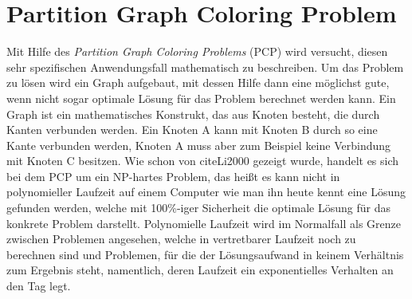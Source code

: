 \section{Partition Graph Coloring Problem}
Mit Hilfe des \textit{Partition Graph Coloring Problems} (PCP) wird versucht, diesen sehr spezifischen Anwendungsfall mathematisch zu beschreiben. Um das Problem zu lösen wird ein Graph aufgebaut, mit dessen Hilfe dann eine möglichst gute, wenn nicht sogar optimale Lösung für das Problem berechnet werden kann. Ein Graph ist ein mathematisches Konstrukt, das aus Knoten besteht, die durch Kanten verbunden werden. Ein Knoten A kann mit Knoten B durch so eine Kante verbunden werden, Knoten A muss aber zum Beispiel keine Verbindung mit Knoten C besitzen. Wie schon von cite{Li2000} gezeigt wurde, handelt es sich bei dem PCP um ein NP-hartes Problem, das heißt es kann nicht in polynomieller Laufzeit auf einem Computer wie man ihn heute kennt eine Lösung gefunden werden, welche mit 100\%-iger Sicherheit die optimale Lösung für das konkrete Problem darstellt. Polynomielle Laufzeit wird im Normalfall als Grenze zwischen Problemen angesehen, welche in vertretbarer Laufzeit noch zu berechnen sind und Problemen, für die der Lösungsaufwand in keinem Verhältnis zum Ergebnis steht, namentlich, deren Laufzeit ein exponentielles Verhalten an den Tag legt.

